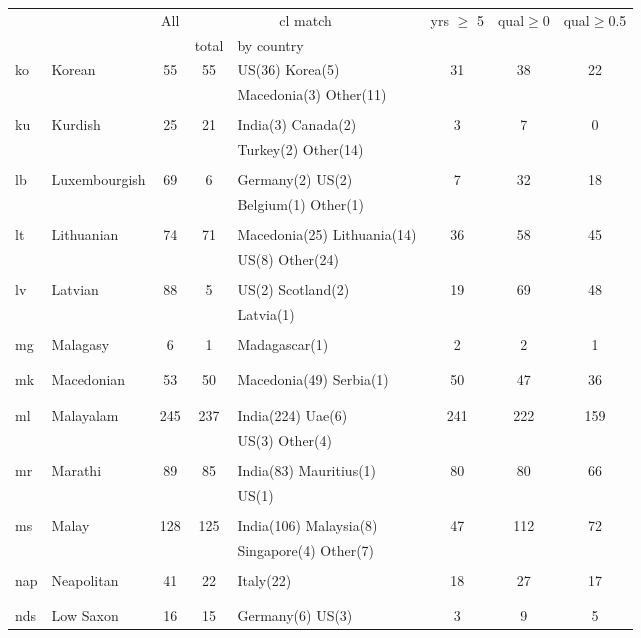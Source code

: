 \begin{figure}[h]
\centering
\begin{tabular}{llcclccc}
&&All&\multicolumn{2}{c}{cl match}&yrs $\geq$ 5&qual$\geq$0&qual$\geq$0.5\\
&&&total&by country&&\\
\hline\hline
ko&Korean&55&55&US(36) Korea(5) &31&38&22\\
&&&&Macedonia(3) Other(11) &&&\\
&&&&&&&\\
ku&Kurdish&25&21&India(3) Canada(2) &3&7&0\\
&&&&Turkey(2) Other(14) &&&\\
&&&&&&&\\
lb&Luxembourgish&69&6&Germany(2) US(2) &7&32&18\\
&&&&Belgium(1) Other(1) &&&\\
&&&&&&&\\
lt&Lithuanian&74&71&Macedonia(25) Lithuania(14) &36&58&45\\
&&&&US(8) Other(24) &&&\\
&&&&&&&\\
lv&Latvian&88&5&US(2) Scotland(2) &19&69&48\\
&&&&Latvia(1) &&&\\
&&&&&&&\\
mg&Malagasy&6&1&Madagascar(1) &2&2&1\\
&&&&&&&\\
&&&&&&&\\
mk&Macedonian&53&50&Macedonia(49) Serbia(1) &50&47&36\\
&&&&&&&\\
&&&&&&&\\
ml&Malayalam&245&237&India(224) Uae(6) &241&222&159\\
&&&&US(3) Other(4) &&&\\
&&&&&&&\\
mr&Marathi&89&85&India(83) Mauritius(1) &80&80&66\\
&&&&US(1) &&&\\
&&&&&&&\\
ms&Malay&128&125&India(106) Malaysia(8) &47&112&72\\
&&&&Singapore(4) Other(7) &&&\\
&&&&&&&\\
nap&Neapolitan&41&22&Italy(22) &18&27&17\\
&&&&&&&\\
&&&&&&&\\
nds&Low Saxon&16&15&Germany(6) US(3) &3&9&5\\

\end{tabular}
\end{figure}
